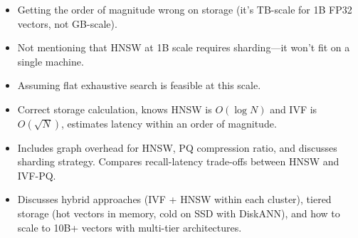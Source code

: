 \begin{interviewq}
\redflags
\begin{itemize}
    \item Getting the order of magnitude wrong on storage (it's TB-scale for 1B FP32 vectors, not GB-scale).
    \item Not mentioning that HNSW at 1B scale requires sharding---it won't fit on a single machine.
    \item Assuming flat exhaustive search is feasible at this scale.
\end{itemize}


\goodgreat
\begin{itemize}
    \item {} Correct storage calculation, knows HNSW is $O(\log N)$ and IVF is $O(\sqrt{N})$, estimates latency within an order of magnitude.
    \item {} Includes graph overhead for HNSW, PQ compression ratio, and discusses sharding strategy. Compares recall-latency trade-offs between HNSW and IVF-PQ.
    \item {} Discusses hybrid approaches (IVF + HNSW within each cluster), tiered storage (hot vectors in memory, cold on SSD with DiskANN), and how to scale to 10B+ vectors with multi-tier architectures.
\end{itemize}

\end{interviewq}



